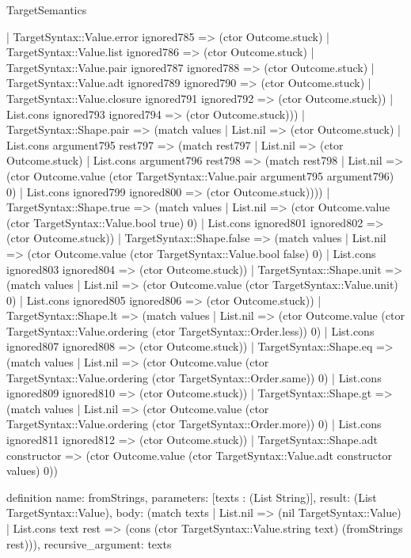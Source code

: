 \begin{lexlean}{TargetSemantics}
\begin{semanticmodule}
{          | TargetSyntax::Value.error ignored785 => (ctor Outcome.stuck)
          | TargetSyntax::Value.list ignored786 => (ctor Outcome.stuck)
          | TargetSyntax::Value.pair ignored787 ignored788 => (ctor Outcome.stuck)
          | TargetSyntax::Value.adt ignored789 ignored790 => (ctor Outcome.stuck)
          | TargetSyntax::Value.closure ignored791 ignored792 => (ctor Outcome.stuck))
        | List.cons ignored793 ignored794 => (ctor Outcome.stuck)))
    | TargetSyntax::Shape.pair => (match values
      | List.nil => (ctor Outcome.stuck)
      | List.cons argument795 rest797 => (match rest797
        | List.nil => (ctor Outcome.stuck)
        | List.cons argument796 rest798 => (match rest798
          | List.nil => (ctor Outcome.value (ctor TargetSyntax::Value.pair argument795 argument796) 0)
          | List.cons ignored799 ignored800 => (ctor Outcome.stuck))))
    | TargetSyntax::Shape.true => (match values
      | List.nil => (ctor Outcome.value (ctor TargetSyntax::Value.bool true) 0)
      | List.cons ignored801 ignored802 => (ctor Outcome.stuck))
    | TargetSyntax::Shape.false => (match values
      | List.nil => (ctor Outcome.value (ctor TargetSyntax::Value.bool false) 0)
      | List.cons ignored803 ignored804 => (ctor Outcome.stuck))
    | TargetSyntax::Shape.unit => (match values
      | List.nil => (ctor Outcome.value (ctor TargetSyntax::Value.unit) 0)
      | List.cons ignored805 ignored806 => (ctor Outcome.stuck))
    | TargetSyntax::Shape.lt => (match values
      | List.nil => (ctor Outcome.value (ctor TargetSyntax::Value.ordering (ctor TargetSyntax::Order.less)) 0)
      | List.cons ignored807 ignored808 => (ctor Outcome.stuck))
    | TargetSyntax::Shape.eq => (match values
      | List.nil => (ctor Outcome.value (ctor TargetSyntax::Value.ordering (ctor TargetSyntax::Order.same)) 0)
      | List.cons ignored809 ignored810 => (ctor Outcome.stuck))
    | TargetSyntax::Shape.gt => (match values
      | List.nil => (ctor Outcome.value (ctor TargetSyntax::Value.ordering (ctor TargetSyntax::Order.more)) 0)
      | List.cons ignored811 ignored812 => (ctor Outcome.stuck))
    | TargetSyntax::Shape.adt constructor => (ctor Outcome.value (ctor TargetSyntax::Value.adt constructor values) 0))
}

definition{
  name: fromStrings,
  parameters: [texts : (List String)],
  result: (List TargetSyntax::Value),
  body: (match texts
    | List.nil => (nil TargetSyntax::Value)
    | List.cons text rest => (cons (ctor TargetSyntax::Value.string text) (fromStrings rest))),
  recursive_argument: texts
}


\end{semanticmodule}
\end{lexlean}
